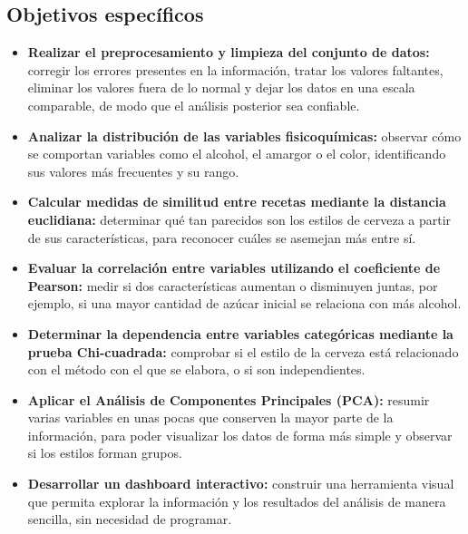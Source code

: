 \documentclass[11pt]{article}
\begin{document}
\subsection*{Objetivos específicos}
\begin{itemize}
    \item \textbf{Realizar el preprocesamiento y limpieza del conjunto de datos:}
    corregir los errores presentes en la información, tratar los valores faltantes,
    eliminar los valores fuera de lo normal y dejar los datos en una escala
    comparable, de modo que el análisis posterior sea confiable.

    \item \textbf{Analizar la distribución de las variables fisicoquímicas:}
    observar cómo se comportan variables como el alcohol, el amargor o el color,
    identificando sus valores más frecuentes y su rango.

    \item \textbf{Calcular medidas de similitud entre recetas mediante la distancia
    euclidiana:} determinar qué tan parecidos son los estilos de cerveza a partir
    de sus características, para reconocer cuáles se asemejan más entre sí.

    \item \textbf{Evaluar la correlación entre variables utilizando el coeficiente
    de Pearson:} medir si dos características aumentan o disminuyen juntas, por
    ejemplo, si una mayor cantidad de azúcar inicial se relaciona con más alcohol.

    \item \textbf{Determinar la dependencia entre variables categóricas mediante la
    prueba Chi-cuadrada:} comprobar si el estilo de la cerveza está relacionado con
    el método con el que se elabora, o si son independientes.

    \item \textbf{Aplicar el Análisis de Componentes Principales (PCA):} resumir
    varias variables en unas pocas que conserven la mayor parte de la información,
    para poder visualizar los datos de forma más simple y observar si los estilos
    forman grupos.

    \item \textbf{Desarrollar un dashboard interactivo:} construir una herramienta
    visual que permita explorar la información y los resultados del análisis de
    manera sencilla, sin necesidad de programar.
\end{itemize}


\end{document}
